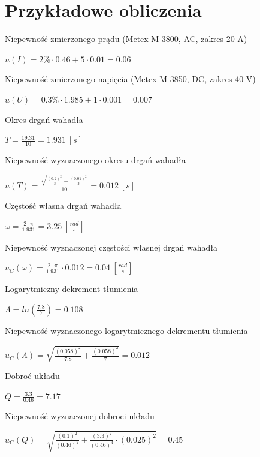 \documentclass[12pt, a4paper, oneside]{article}
\begin{document}
\section{Przykładowe obliczenia}
Niepewność zmierzonego prądu (Metex M-3800, AC, zakres 20 A)
\begin{center}
$u(I)=2\% \cdot 0.46 + 5\cdot0.01=0.06$
\end{center}
Niepewność zmierzonego napięcia (Metex M-3850, DC, zakres 40 V)
\begin{center}
$u(U)=0.3\% \cdot 1.985 + 1\cdot 0.001=0.007$
\end{center}
Okres drgań wahadła
\begin{center}
$T=\frac{19.31}{10}=1.931~[s]$
\end{center}
Niepewność wyznaczonego okresu drgań wahadła
\begin{center}
$u(T)=\frac{\sqrt{\frac{(0.2)^2}{3} + \frac{(0.01)^2}{3}}}{10}=0.012~[s]$
\end{center}
Częstość własna drgań wahadła
\begin{center}
$\omega=\frac{2\cdot\pi}{1.931}=3.25~[\frac{rad}{s}]$
\end{center}
Niepewność wyznaczonej częstości własnej drgań wahadła
\begin{center}
$u_C(\omega) = \frac{2\cdot\pi}{1.931}\cdot0.012=0.04~[\frac{rad}{s}]$
\end{center}
Logarytmiczny dekrement tłumienia
\begin{center}
$\Lambda=ln(\frac{7.8}{7})=0.108$
\end{center}
Niepewność wyznaczonego logarytmicznego dekrementu tłumienia
\begin{center}
$u_C(\Lambda)=\sqrt{\frac{(0.058)^2}{7.8} + \frac{(0.058)^2}{7}}=0.012$
\end{center}
Dobroć układu
\begin{center}
$Q = \frac{3.3}{0.46}=7.17$
\end{center}
Niepewność wyznaczonej dobroci układu
\begin{center}
$u_C(Q) = \sqrt{\frac{(0.1)^2}{(0.46)^2} + \frac{(3.3)^2}{(0.46)^4}\cdot(0.025)^2}=0.45$
\end{center}
\end{document}
